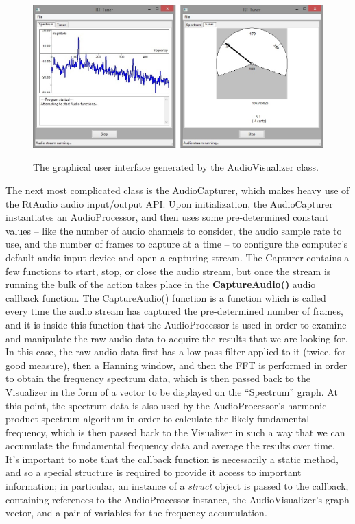 \documentclass[12pt]{report}
\begin{document}
\begin{figure}[h]
	\centering
	\includegraphics[width=140mm]{visualizer.jpg} \\
	\caption[RT-Tuner GUI]{The graphical user interface generated by the AudioVisualizer class.} 
	\label{fig:gui} 
\end{figure}	

\indent The next most complicated class is the AudioCapturer, which makes heavy use of the RtAudio audio input/output API. Upon initialization, the AudioCapturer instantiates an AudioProcessor, and then uses some pre-determined constant values -- like the number of audio channels to consider, the audio sample rate to use, and the number of frames to capture at a time -- to configure the computer's default audio input device and open a capturing stream. The Capturer contains a few functions to start, stop, or close the audio stream, but once the stream is running the bulk of the action takes place in the {\bf CaptureAudio()} audio callback function. The CaptureAudio() function is a function which is called every time the audio stream has captured the pre-determined number of frames, and it is inside this function that the AudioProcessor is used in order to examine and manipulate the raw audio data to acquire the results that we are looking for. In this case, the raw audio data first has a low-pass filter applied to it (twice, for good measure), then a Hanning window, and then the FFT is performed in order to obtain the frequency spectrum data, which is then passed back to the Visualizer in the form of a vector to be displayed on the ``Spectrum'' graph. At this point, the spectrum data is also used by the AudioProcessor's harmonic product spectrum algorithm in order to calculate the likely fundamental frequency, which is then passed back to the Visualizer in such a way that we can accumulate the fundamental frequency data and average the results over time. It's important to note that the callback function is necessarily a static method, and so a special structure is required to provide it access to important information; in particular, an instance of a \emph{struct} object is passed to the callback, containing references to the AudioProcessor instance, the AudioVisualizer's graph vector, and a pair of variables for the frequency accumulation.
\end{document}
